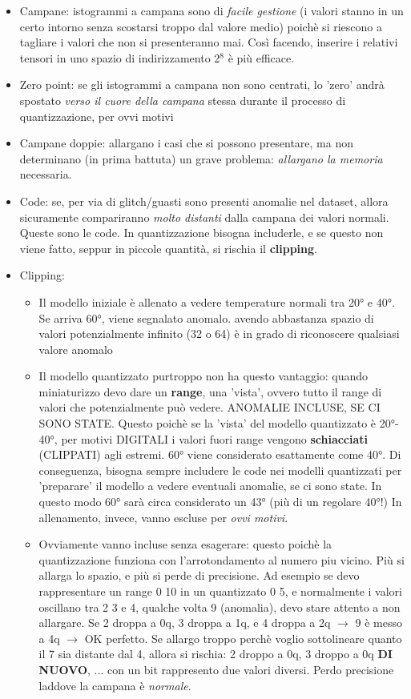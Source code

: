 \begin{itemize}
    \item Campane: istogrammi a campana sono di \textit{facile gestione} (i valori stanno in un certo intorno senza scostarsi troppo dal valore medio) poichè si riescono a tagliare i valori che non si presenteranno mai. Così facendo, inserire i relativi tensori in uno spazio di indirizzamento 2$^8$ è più efficace. 
    \item Zero point: se gli istogrammi a campana non sono centrati, lo 'zero' andrà spostato \textit{verso il cuore della campana} stessa durante il processo di quantizzazione, per ovvi motivi
    \item Campane doppie: allargano i casi che si possono presentare, ma non determinano (in prima battuta) un grave problema: \textit{allargano la memoria} necessaria.
    \item Code: se, per via di glitch/guasti sono presenti anomalie nel dataset, allora sicuramente compariranno \textit{molto distanti} dalla campana dei valori normali. Queste sono le code. In quantizzazione bisogna includerle, e se questo non viene fatto, seppur in piccole quantità, si rischia il \textbf{clipping}.
    \item Clipping: 
    \begin{itemize}
        \item Il modello iniziale è allenato a vedere temperature normali tra 20° e 40°. Se arriva 60°, viene segnalato anomalo. avendo abbastanza spazio di valori potenzialmente infinito (32 o 64) è in grado di riconoscere qualsiasi valore anomalo
        \item Il modello quantizzato purtroppo non ha questo vantaggio: quando miniaturizzo devo dare un \textbf{range}, una 'vista', ovvero tutto il range di valori che potenzialmente può vedere. ANOMALIE INCLUSE, SE CI SONO STATE. Questo poichè se la 'vista' del modello quantizzato è 20°- 40°, per motivi DIGITALI i valori fuori range vengono \textbf{schiacciati} (CLIPPATI) agli estremi. 60° viene considerato esattamente come 40°. Di conseguenza, bisogna sempre includere le code nei modelli quantizzati per 'preparare' il modello a vedere eventuali anomalie, se ci sono state. In questo modo 60° sarà circa considerato un 43° (più di un regolare 40°!) In allenamento, invece, vanno escluse per \textit{ovvi motivi}.
        \item Ovviamente vanno incluse senza esagerare: questo poichè la quantizzazione funziona con l'arrotondamento al numero piu vicino. Più si allarga lo spazio, e più si perde di precisione. Ad esempio se devo rappresentare un range 0 10 in un quantizzato 0 5, e normalmente i valori oscillano tra 2 3 e 4, qualche volta 9 (anomalia), devo stare attento a non allargare. Se 2 droppa a 0q, 3 droppa a 1q, e 4 droppa a 2q $\rightarrow$ 9 è messo a 4q $\rightarrow$ OK perfetto. Se allargo troppo perchè voglio sottolineare quanto il 7 sia distante dal 4, allora si rischia: 2 droppo a 0q, 3 droppo a 0q \textbf{DI NUOVO}, ... con un bit rappresento due valori diversi. Perdo precisione laddove la campana è \textit{normale}.

\end{itemize}
\end{itemize}
